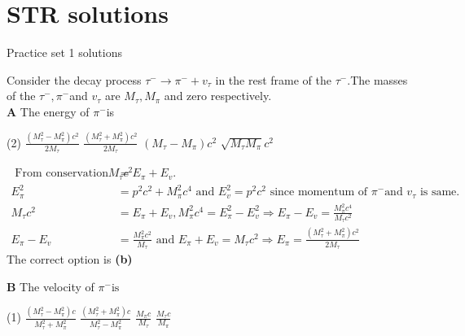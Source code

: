\chapter{STR solutions}
\begin{abox}
	Practice set 1 solutions
	\end{abox}
\begin{enumerate}
\begin{minipage}{\textwidth}
	\item Consider the decay process $\tau^{-} \rightarrow \pi^{-}+v_{\tau}$ in the rest frame of the $\tau^{-} .$The masses of the $\tau^{-}, \pi^{-}$and $v_{\tau}$ are $M_{\tau}, M_{\pi}$ and zero respectively.\\
	\textbf{A} The energy of $\pi^{-}$is
\end{minipage}
\begin{tasks}(2)
	\task[\textbf{A.}] $\frac{\left(M_{\tau}^{2}-M_{\pi}^{2}\right) c^{2}}{2 M_{\tau}}$
	\task[\textbf{B.}]$\frac{\left(M_{\tau}^{2}+M_{\pi}^{2}\right) c^{2}}{2 M_{\tau}}$
	\task[\textbf{C.}]$\left(M_{\tau}-M_{\pi}\right) c^{2}$
	\task[\textbf{D.}]$\sqrt{M_{\tau} M_{\pi}} c^{2}$
\end{tasks}
\begin{answer}
	\begin{align*}
	\text { From conservation of energy } M_{\tau} c^{2}&=E_{\pi}+E_{v} \text {. }\\
	E_{\pi}^{2}&=p^{2} c^{2}+M_{\pi}^{2} c^{4} \text { and } E_{v}^{2}=p^{2} c^{2} \text { since momentum of } \pi^{-} \text {and } v_{\tau} \text { is same. }\\
	M_{\tau} c^{2}&=E_{\pi}+E_{v}, M_{\pi}^{2} c^{4}=E_{\pi}^{2}-E_{v}^{2} \Rightarrow E_{\pi}-E_{v}=\frac{M_{\pi}^{2} c^{4}}{M_{\tau} c^{2}}\\
	E_{\pi}-E_{v}&=\frac{M_{\pi}^{2} c^{2}}{M_{\tau}} \text { and } E_{\pi}+E_{v}=M_{\tau} c^{2} \Rightarrow E_{\pi}=\frac{\left(M_{\tau}^{2}+M_{\pi}^{2}\right) c^{2}}{2 M_{\tau}}
	\end{align*}
	The correct option is \textbf{(b)}
\end{answer}
\textbf{B} The velocity of  $\pi^{-} \text {is }$
\begin{tasks}(1)
	\task[\textbf{A.}] $\frac{\left(M_{\tau}^{2}-M_{\pi}^{2}\right) c}{M_{\tau}^{2}+M_{\pi}^{2}}$
	\task[\textbf{B.}]$\frac{\left(M_{\tau}^{2}+M_{\pi}^{2}\right) c}{M_{\tau}^{2}-M_{\pi}^{2}}$ 
	\task[\textbf{C.}] $\frac{M_{\pi} c}{M_{\tau}}$
	\task[\textbf{D.}]$\frac{M_{\tau} c}{M_{\pi}}$
\end{tasks}

\end{enumerate}
